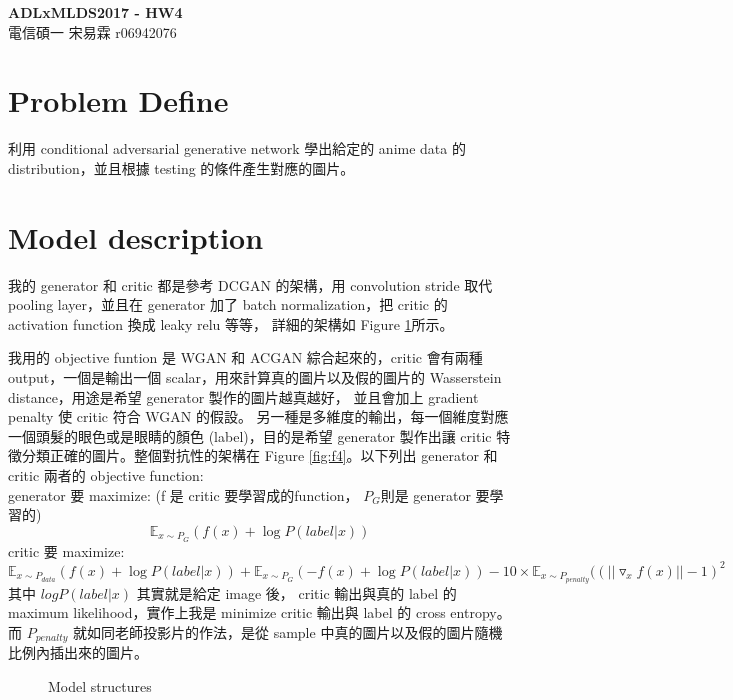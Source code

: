 \documentclass[10pt, a4paper]{article}
\begin{document}
\begin{CJK}{UTF8}{bkai}
\centering
\huge \textbf{ADLxMLDS2017 - HW4}\\
\raggedleft
\large {電信碩一 宋易霖 r06942076}\linebreak[2]\par
\end{CJK}

\begin{CJK}{UTF8}{bkai}
\section{Problem Define}
利用 conditional adversarial generative network 學出給定的 anime data 的 distribution，並且根據 testing 的條件產生對應的圖片。

\section{Model description}
我的 generator 和 critic 都是參考 DCGAN 的架構，用 convolution stride 取代 pooling layer，並且在 generator 加了 batch normalization，把 critic 的 activation function 換成 leaky relu 等等， 詳細的架構如 Figure \ref{fig:f1}所示。\par

\noindent
我用的 objective funtion 是 WGAN 和 ACGAN 綜合起來的，critic 會有兩種 output，一個是輸出一個 scalar，用來計算真的圖片以及假的圖片的 Wasserstein distance，用途是希望 generator 製作的圖片越真越好， 並且會加上 gradient penalty 使 critic 符合 WGAN 的假設。 另一種是多維度的輸出，每一個維度對應一個頭髮的眼色或是眼睛的顏色 (label)，目的是希望 generator 製作出讓 critic 特徵分類正確的圖片。整個對抗性的架構在 Figure \ref{fig:f4}。以下列出 generator 和 critic 兩者的 objective function: \\
\noindent
generator 要 maximize: (f 是 critic 要學習成的function， $P_G$則是 generator 要學習的)
\[ \mathbb{E}_{x \sim P_G}(f(x) + \log P(label | x)) \]
critic 要 maximize:
\[ \mathbb{E}_{x \sim P_{data}}(f(x) + \log P(label | x)) + \mathbb{E}_{x \sim P_G}(-f(x) + \log P(label|x)) - 10\times \mathbb{E}_{x \sim P_{penalty}}(
(||\triangledown_{x}f(x)|| - 1)^2 \]
其中 $logP(label | x) $ 其實就是給定 image 後， critic 輸出與真的 label 的 maximum likelihood，實作上我是 minimize critic 輸出與 label 的 cross entropy。而 $P_{penalty}$ 就如同老師投影片的作法，是從 sample 中真的圖片以及假的圖片隨機比例內插出來的圖片。 
\begin{figure}[!htb]
\centering
{}
\hfill
{}
\hfill
\caption{Model structures}
\label{fig:f1}
\end{figure}


\end{CJK}
\end{document}

